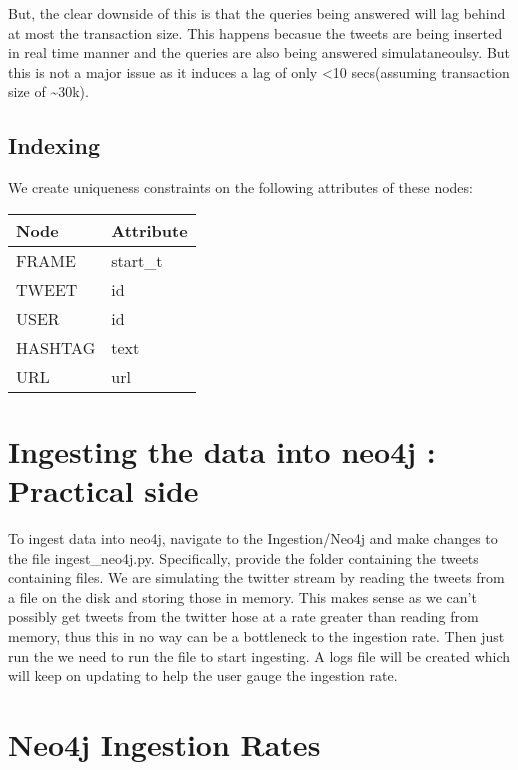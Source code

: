 \documentclass[letterpaper,10pt,english]{sphinxmanual}
\begin{document}
But, the clear downside of this is that the queries being answered will lag behind at most the transaction size. This happens becasue the tweets are being inserted in real time manner and the queries are also being answered simulataneoulsy. But this is not a major issue as it induces a lag of only \textless{}10 secs(assuming transaction size of \textasciitilde{}30k).


\subsection{Indexing}
\label{\detokenize{neo4j_data_ingestion:indexing}}
We create uniqueness constraints on the following attributes of these nodes:


\begin{savenotes}\sphinxattablestart
\centering
\begin{tabulary}{\linewidth}[t]{|T|T|}
\hline
\sphinxstyletheadfamily 
Node
&\sphinxstyletheadfamily 
Attribute
\\
\hline
FRAME
&
start\_t
\\
\hline
TWEET
&
id
\\
\hline
USER
&
id
\\
\hline
HASHTAG
&
text
\\
\hline
URL
&
url
\\
\hline
\end{tabulary}
\par
\sphinxattableend\end{savenotes}


\section{Ingesting the data into neo4j : Practical side}
\label{\detokenize{neo4j_data_ingestion:ingesting-the-data-into-neo4j-practical-side}}
To ingest data into neo4j, navigate to the Ingestion/Neo4j and make changes to the file ingest\_neo4j.py. Specifically, provide the folder containing the tweets containing files. We are simulating the twitter stream by reading the tweets from a file on the disk and storing those in memory. This makes sense as we can’t possibly get tweets from the twitter hose at a rate greater than reading from memory, thus this in no way can be a bottleneck to the ingestion rate. Then just run the we need to run the file  to start ingesting. A logs file will be created which will keep on updating to help the user gauge the ingestion rate.


\section{Neo4j Ingestion Rates}
\label{\detokenize{neo4j_data_ingestion:neo4j-ingestion-rates}}
\noindent{}
\end{document}
